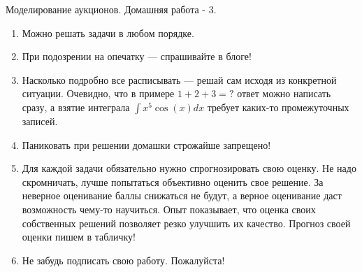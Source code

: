 \documentclass[pdftex,12pt,a4paper]{article}
\begin{document}


\begin{Large}
Моделирование аукционов. Домашняя работа - 3.
\end{Large}

\begin{enumerate}
\item Можно решать задачи в любом порядке.
\item При подозрении на опечатку --- спрашивайте в блоге!
\item Насколько подробно все расписывать --- решай сам исходя из конкретной ситуации. Очевидно, что в примере $ 1+2+3=? $ ответ можно написать сразу, а взятие интеграла $ \int x^{5}\cos(x)dx $ требует каких-то промежуточных записей.
\item Паниковать при решении домашки строжайше запрещено!
\item Для каждой задачи обязательно нужно спрогнозировать свою оценку. Не надо скромничать, лучше попытаться объективно оценить свое решение.  За неверное оценивание баллы снижаться не будут, а верное оценивание даст возможность чему-то научиться. Опыт показывает, что оценка своих собственных решений позволяет резко улучшить их качество. Прогноз своей оценки пишем в табличку!
\item Не забудь подписать свою работу. Пожалуйста!

\end{enumerate}
\end{document}
